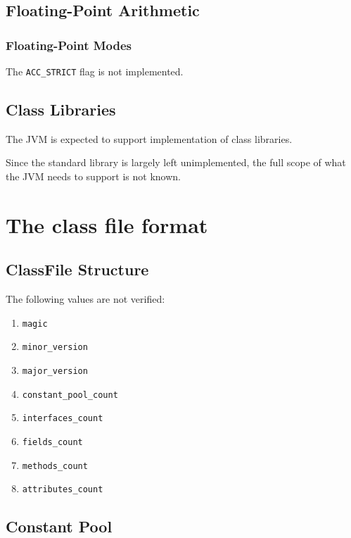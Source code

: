 \subsection{Floating-Point Arithmetic}
\subsubsection{Floating-Point Modes}

The \texttt{ACC\_STRICT} flag is not implemented.

\addtocounter{subsection}{3}

\subsection{Class Libraries}

The JVM is expected to support implementation of class libraries.

Since the standard library is largely left unimplemented, the full scope of what the JVM needs to support is not known.

\section{The class file format}

\subsection{ClassFile Structure}

The following values are not verified:

\begin{enumerate}
\item \texttt{magic}
\item \texttt{minor\_version}
\item \texttt{major\_version}
\item \texttt{constant\_pool\_count}
\item \texttt{interfaces\_count}
\item \texttt{fields\_count}
\item \texttt{methods\_count}
\item \texttt{attributes\_count}
\end{enumerate}

\addtocounter{subsection}{2}
\subsection{Constant Pool}

